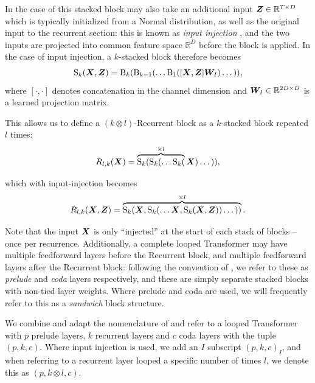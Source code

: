 
In the case of \citet{geiping2025scaling,mcleish2025teaching} this stacked block may also take an additional input ${\bm{Z}} \in \mathbb{R}^{T \times D}$ which is typically initialized from a Normal distribution, as well as the original input to the recurrent section: this is known as \emph{input injection} \citep{bai2019deep,anil2022path}, and the two inputs are projected into common feature space $\mathbb{R}^D$ before the block is applied. In the case of input injection, a $k$-stacked block therefore becomes
\begin{equation}
    \operatorname{S}_k({\bm{X}}, {\bm{Z}}) = \operatorname{B}_k ( \operatorname{B}_{k-1}( \dots \operatorname{B}_1([{\bm{X}}, {\bm{Z}}] {\bm{W}}_I) \dots )),
\end{equation}
where $[\cdot, \cdot]$ denotes concatenation in the channel dimension and ${\bm{W}}_I \in \mathbb{R}^{2D \times D}$ is a learned projection matrix.

This allows us to define a $(k \otimes l)$-Recurrent block as a $k$-stacked block repeated $l$ times:
\begin{equation}
    R_{l,k}({\bm{X}}) = \overbrace{\operatorname{S}_k ( \operatorname{S}_{k}( \dots \operatorname{S}_k(}^{\times l} {\bm{X}}) \dots )),
\end{equation}

which with input-injection becomes
\begin{equation}
    R_{l,k}({\bm{X}}, {\bm{Z}}) = \overbrace{\operatorname{S}_k ( {\bm{X}}, \operatorname{S}_{k}( \dots {\bm{X}}, \operatorname{S}_k( {\bm{X}}, {\bm{Z}})) \dots ))}^{\times l}.
\end{equation}

Note that the input ${\bm{X}}$ is only ``injected'' at the start of each stack of blocks -- once per recurrence. Additionally, a complete looped Transformer may have multiple feedforward layers before the Recurrent block, and multiple feedforward layers after the Recurrent block: following the convention of \citet{geiping2025scaling}, we refer to these as \emph{prelude} and \emph{coda} layers respectively, and these are simply separate stacked blocks with non-tied layer weights. Where prelude and coda are used, we will frequently refer to this as a \emph{sandwich} block structure.

We combine and adapt the nomenclature of \citet{geiping2025scaling,saunshi2025reasoning} and refer to a looped Transformer with $p$ prelude layers, $k$ recurrent layers and $c$ coda layers with the tuple $(p, k, c)$. Where input injection is used, we add an $I$ subscript $(p, k, c)_I$, and when referring to a recurrent layer looped a specific number of times $l$, we denote this as $(p, k \otimes l, c)$.


